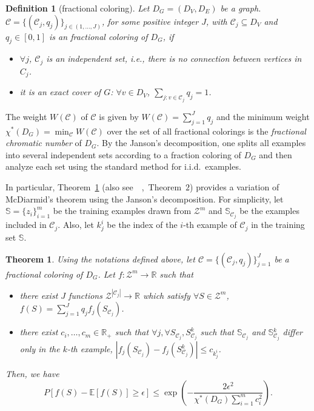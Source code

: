 \documentclass[letterpaper]{article} %
\newtheorem{theorem}{Theorem}
\newtheorem{definition}{Definition}
\newcommand{\E}{\mathbb{E}}
\newcommand{\Pro}{P}
\newcommand{\real}{\mathbb{R}}
\newcommand{\zspace}{\mathcal{Z}}
\newcommand{\fcoloring}{\chi^*}
\newcommand{\set}[1]{\{#1\}}
\newcommand{\trainingset}{\mathbb{S}}
\newcommand{\citep}[3]{(#1\ \citeauthor{#3}\ \citeyear{#3},\ #2)}
\begin{document}
\begin{definition}[fractional coloring]
  Let $D_G=(D_V,D_E)$ be a graph. $\mathcal{C}=\set{(\mathcal{C}_j,q_j)}_{j\in (1,\dots,J)}$, for some positive integer $J$, with $\mathcal{C}_j\subseteq D_V$ and $q_j\in [0,1]$ is an fractional coloring of $D_G$, if
  \begin{itemize}
    \item $\forall j$, $\mathcal{C}_j$ is an independent set, i.e., there is no connection between vertices in $C_j$.
    \item it is an exact cover of $G$: $\forall v \in D_V$, $\sum_{j: v\in \mathcal{C}_j} q_j = 1$.
  \end{itemize}
\end{definition}
The weight $W(\mathcal{C})$ of $\mathcal{C}$ is given by $W(\mathcal{C})=\sum_{j=1}^J q_j$ and the minimum weight $\fcoloring{}(D_G)=\min_{\mathcal{C}} W(\mathcal{C})$ over the set of all fractional colorings is the \emph{fractional chromatic number} of $D_G$.
By the Janson's decomposition, one splits all examples into several independent sets according to a fraction coloring of $D_G$ and then analyze each set using the standard method for i.i.d.\ examples.

In particular, Theorem~\ref{th:fractional_mcdiarmid} \citep{also see}{Theorem~$2$}{Usunier2005} provides a variation of McDiarmid's theorem using the Janson's decomposition.
For simplicity, let $\trainingset=\set{z_i}_{i=1}^{m}$ be the training examples drawn from $\zspace^m$ and $\trainingset{}_{\mathcal{C}_j}$ be the examples included in $\mathcal{C}_j$.
Also, let $k_j^i$ be the index of the $i$-th example of $\mathcal{C}_j$ in the training set $\trainingset{}$.

\begin{theorem}
   \label{th:fractional_mcdiarmid}
   Using the notations defined above, let $\mathcal{C} = \set{(\mathcal{C}_j, q_j)}_{j=1}^J$ be a fractional coloring of $D_G$. Let $f:\zspace^m \to \real{}$ such that
   \begin{itemize}
     \item there exist $J$ functions $\zspace^{|\mathcal{C}_j|} \to \real{}$ which satisfy $\forall S\in \zspace^m$, $f(S)=\sum_{j=1}^J q_j f_j(S_{\mathcal{C}_j})$.
     \item there exist $c_i,\dots,c_m\in \real{}_+$ such that $\forall j,\forall S_{\mathcal{C}_j}, S_{\mathcal{C}_j}^k$ such that $\trainingset{}_{\mathcal{C}_j}$ and $\trainingset{}_{\mathcal{C}_j}^k$ differ only in the $k$-th example, $|f_j(S_{\mathcal{C}_j}) - f_j(S_{\mathcal{C}_j}^k)|\le c_{k_j^i}$.
   \end{itemize}
     Then, we have
     \[\Pro[f(S)-\E[f(S)]\ge \epsilon] \le \exp\left(-\frac{2\epsilon^2}{\fcoloring{}(D_G)\sum_{i=1}^mc_i^2}\right).\]
 \end{theorem}
\end{document}
